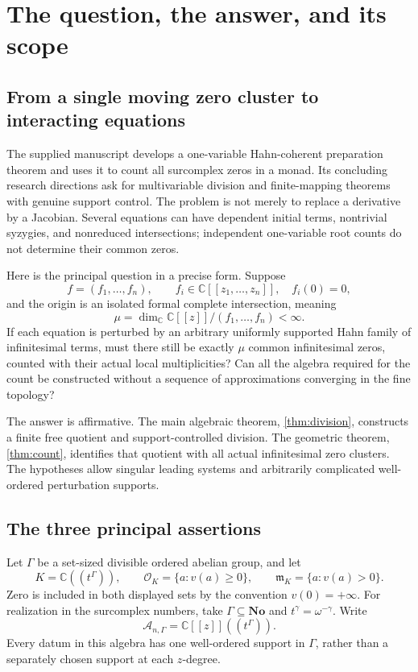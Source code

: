 \documentclass[11pt,letterpaper]{article}
\theoremstyle{definition}
\theoremstyle{remark}
\newcommand{\No}{\mathbf{No}}
\newcommand{\C}{\mathbb C}
\newcommand{\A}{\mathscr A}
\newcommand{\OO}{\mathcal O}
\newcommand{\mm}{\mathfrak m}
\numberwithin{equation}{section}
\begin{document}
\tableofcontents
\newpage

\section{The question, the answer, and its scope}\label{sec:intro}
\subsection{From a single moving zero cluster to interacting equations}
The supplied manuscript \cite{Prior} develops a one-variable Hahn-coherent preparation theorem and uses it to count all surcomplex zeros in a monad. Its concluding research directions ask for multivariable division and finite-mapping theorems with genuine support control. The problem is not merely to replace a derivative by a Jacobian. Several equations can have dependent initial terms, nontrivial syzygies, and nonreduced intersections; independent one-variable root counts do not determine their common zeros.

Here is the principal question in a precise form. Suppose
\[
 f=(f_1,\ldots,f_n),\qquad f_i\in\C[[z_1,\ldots,z_n]],\quad f_i(0)=0,
\]
and the origin is an isolated formal complete intersection, meaning
\begin{equation}\label{eq:mu}
 \mu=\dim_\C\C[[z]]/(f_1,\ldots,f_n)<\infty.
\end{equation}
If each equation is perturbed by an arbitrary uniformly supported Hahn family of infinitesimal terms, must there still be exactly $\mu$ common infinitesimal zeros, counted with their actual local multiplicities? Can all the algebra required for the count be constructed without a sequence of approximations converging in the fine topology?

The answer is affirmative. The main algebraic theorem, \cref{thm:division}, constructs a finite free quotient and support-controlled division. The geometric theorem, \cref{thm:count}, identifies that quotient with all actual infinitesimal zero clusters. The hypotheses allow singular leading systems and arbitrarily complicated well-ordered perturbation supports.

\subsection{The three principal assertions}
Let $\Gamma$ be a set-sized divisible ordered abelian group, and let
\[
 K=\C((t^\Gamma)),\qquad
 \OO_K=\{a:v(a)\geq0\},\qquad \mm_K=\{a:v(a)>0\}.
\]
Zero is included in both displayed sets by the convention $v(0)=+\infty$. For realization in the surcomplex numbers, take $\Gamma\subseteq\No$ and $t^\gamma=\omega^{-\gamma}$. Write
\[
 \A_{n,\Gamma}=\C[[z]]((t^\Gamma)).
\]
Every datum in this algebra has one well-ordered support in $\Gamma$, rather than a separately chosen support at each $z$-degree.
\end{document}

